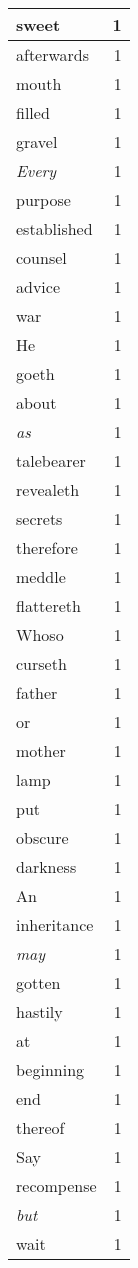\begin{center}
\begin{longtable}{l|r}
sweet & 1\\ \hline 
afterwards & 1\\ \hline 
mouth & 1\\ \hline 
filled & 1\\ \hline 
gravel & 1\\ \hline 
\emph{Every} & 1\\ \hline 
purpose & 1\\ \hline 
established & 1\\ \hline 
counsel & 1\\ \hline 
advice & 1\\ \hline 
war & 1\\ \hline 
He & 1\\ \hline 
goeth & 1\\ \hline 
about & 1\\ \hline 
\emph{as} & 1\\ \hline 
talebearer & 1\\ \hline 
revealeth & 1\\ \hline 
secrets & 1\\ \hline 
therefore & 1\\ \hline 
meddle & 1\\ \hline 
flattereth & 1\\ \hline 
Whoso & 1\\ \hline 
curseth & 1\\ \hline 
father & 1\\ \hline 
or & 1\\ \hline 
mother & 1\\ \hline 
lamp & 1\\ \hline 
put & 1\\ \hline 
obscure & 1\\ \hline 
darkness & 1\\ \hline 
An & 1\\ \hline 
inheritance & 1\\ \hline 
\emph{may} & 1\\ \hline 
gotten & 1\\ \hline 
hastily & 1\\ \hline 
at & 1\\ \hline 
beginning & 1\\ \hline 
end & 1\\ \hline 
thereof & 1\\ \hline 
Say & 1\\ \hline 
recompense & 1\\ \hline 
\emph{but} & 1\\ \hline 
wait & 1\\ \hline 

\end{longtable}
\end{center}
